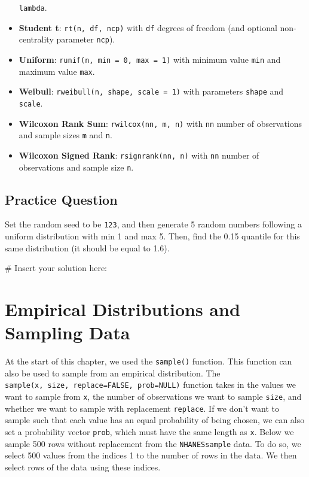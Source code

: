 \documentclass[
  letterpaper,
]{krantz}
\makeatletter
\newenvironment{Shaded}{\begin{snugshade}}{\end{snugshade}}
\newcommand{\CommentTok}[1]{\textcolor[rgb]{0.37,0.37,0.37}{#1}}
\newenvironment{kframe}{%
\medskip{}
\setlength{\fboxsep}{.8em}
 \def\at@end@of@kframe{}%
 \ifinner\ifhmode%
  \def\at@end@of@kframe{\end{minipage}}%
  \begin{minipage}{\columnwidth}%
 \fi\fi%
 \def\FrameCommand##1{\hskip\@totalleftmargin \hskip-\fboxsep
 \colorbox{shadecolor}{##1}\hskip-\fboxsep
     \hskip-\linewidth \hskip-\@totalleftmargin \hskip\columnwidth}%
 \MakeFramed {\advance\hsize-\width
   \@totalleftmargin\z@ \linewidth\hsize
   \@setminipage}}%
 {\par\unskip\endMakeFramed%
 \at@end@of@kframe}
\renewenvironment{Shaded}{\begin{kframe}}{\end{kframe}}
\makeatother
\begin{document}
\begin{itemize}
  \texttt{lambda}.
\item
  \textbf{Student t}: \texttt{rt(n,\ df,\ ncp)} with \texttt{df} degrees
  of freedom (and optional non-centrality parameter \texttt{ncp}).
\item
  \textbf{Uniform}: \texttt{runif(n,\ min\ =\ 0,\ max\ =\ 1)} with
  minimum value \texttt{min} and maximum value \texttt{max}.
\item
  \textbf{Weibull}: \texttt{rweibull(n,\ shape,\ scale\ =\ 1)} with
  parameters \texttt{shape} and \texttt{scale}.
\item
  \textbf{Wilcoxon Rank Sum}: \texttt{rwilcox(nn,\ m,\ n)} with
  \texttt{nn} number of observations and sample sizes \texttt{m} and
  \texttt{n}.
\item
  \textbf{Wilcoxon Signed Rank}: \texttt{rsignrank(nn,\ n)} with
  \texttt{nn} number of observations and sample size \texttt{n}.
\end{itemize}

\subsection{Practice Question}\label{practice-question-15}

Set the random seed to be \texttt{123}, and then generate 5 random
numbers following a uniform distribution with min 1 and max 5. Then,
find the 0.15 quantile for this same distribution (it should be equal to
1.6).

\begin{Shaded}
\begin{Highlighting}[]
\CommentTok{\# Insert your solution here:}
\end{Highlighting}
\end{Shaded}

\section{Empirical Distributions and Sampling
Data}\label{empirical-distributions-and-sampling-data}

At the start of this chapter, we used the \texttt{sample()} function.
This function can also be used to sample from an empirical distribution.
The \texttt{sample(x,\ size,\ replace=FALSE,\ prob=NULL)} function takes
in the values we want to sample from \texttt{x}, the number of
observations we want to sample \texttt{size}, and whether we want to
sample with replacement \texttt{replace}. If we don't want to sample
such that each value has an equal probability of being chosen, we can
also set a probability vector \texttt{prob}, which must have the same
length as \texttt{x}. Below we sample 500 rows without replacement from
the \texttt{NHANESsample} data. To do so, we select 500 values from the
indices 1 to the number of rows in the data. We then select rows of the
data using these indices.
\end{document}
